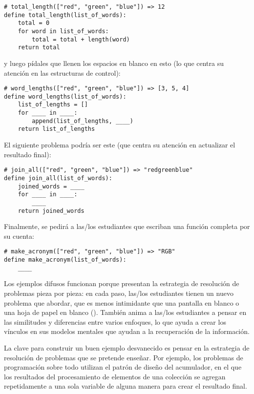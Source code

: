 \begin{verbatim}
# total_length(["red", "green", "blue"]) => 12
define total_length(list_of_words):
    total = 0
    for word in list_of_words:
        total = total + length(word)
    return total
\end{verbatim}

\noindent

y luego pídales que llenen los espacios en blanco en esto
(lo que centra su atención en las estructuras de control):


\begin{verbatim}
# word_lengths(["red", "green", "blue"]) => [3, 5, 4]
define word_lengths(list_of_words):
    list_of_lengths = []
    for ____ in ____:
        append(list_of_lengths, ____)
    return list_of_lengths
\end{verbatim}

El siguiente problema podría ser este
(que centra su atención en actualizar el resultado final):

\begin{verbatim}
# join_all(["red", "green", "blue"]) => "redgreenblue"
define join_all(list_of_words):
    joined_words = ____
    for ____ in ____:
        ____
    return joined_words
\end{verbatim}

Finalmente, se pedirá a las/los estudiantes que escriban una función completa por su cuenta:

\begin{verbatim}
# make_acronym(["red", "green", "blue"]) => "RGB"
define make_acronym(list_of_words):
    ____
\end{verbatim}

Los ejemplos difusos funcionan porque
presentan la estrategia de resolución de problemas pieza por pieza:
en cada paso,
las/los estudiantes tienen un nuevo problema que abordar,
que es menos intimidante que una pantalla en blanco o una hoja de papel en blanco ().
También anima a las/los estudiantes a pensar en las similitudes y diferencias entre varios enfoques,
lo que ayuda a crear los vínculos en sus modelos mentales que ayudan a la recuperación de la información.

La clave para construir un buen ejemplo desvanecido es
pensar en la estrategia de resolución de problemas que se pretende enseñar.
Por ejemplo,
los problemas de programación sobre todo utilizan el patrón de diseño del acumulador,
en el que los resultados del procesamiento de elementos de una colección
se agregan repetidamente a una sola variable de alguna manera para crear el resultado final.


